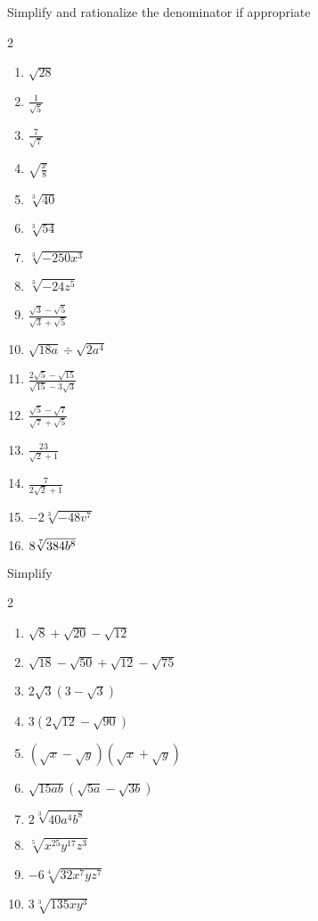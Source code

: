 \documentclass[12pt]{article}
\newenvironment{problem}[2][Problem]{\begin{trivlist}
\item[\hskip \labelsep {\bfseries #1}\hskip \labelsep {\bfseries #2.}]}{\end{trivlist}}
\begin{document}
\begin{problem}{3}
  Simplify and rationalize the denominator if appropriate
 \begin{multicols}{2}
   \begin{enumerate}[label=\roman*)]
     \item $ \sqrt{28}$
     \item $\frac{1}{\sqrt{5}}$
     \item $ \frac{7}{\sqrt{7}}$
     \item $\sqrt{\frac{x}{8}}$
     \item $ \sqrt[3]{40}$
     \item $ \sqrt[3]{54}$
     \item $\sqrt[3]{-250x^3}$
     \item $ \sqrt[3]{-24z^5}$
     \item $\frac{\sqrt{3}-\sqrt{5}}{\sqrt{3}+\sqrt{5}}$
     \item $\sqrt{18a}\div\sqrt{2a^4}$
     \item $\frac{2\sqrt{5}-\sqrt{15}}{\sqrt{15}-3\sqrt{3}}$
     \item $\frac{\sqrt{5}-\sqrt{7}}{\sqrt{7}+\sqrt{5}}$
     \item $ \frac{23}{\sqrt{2}+1}$
     \item $ \frac{7}{2\sqrt{2}+1} $
     \item $ -2\sqrt[3]{-48v^7}$
       \item $ \-8\sqrt[7]{384b^8} $
  \end{enumerate}
 \end{multicols}
\end{problem}


\begin{problem}{4} Simplify
 \begin{multicols}{2}
   \begin{enumerate}[label=\roman*)]
   \item $\sqrt{8}+\sqrt{20}-\sqrt{12}$
   \item $\sqrt{18}-\sqrt{50}+\sqrt{12}-\sqrt{75}$
   \item $ 2\sqrt{3}(3-\sqrt{3})$
   \item $ 3(2\sqrt{12}-\sqrt{90})$
   \item $(\sqrt{x}-\sqrt{y})(\sqrt{x}+\sqrt{y})$
   \item $ \sqrt{15ab}(\sqrt{5a}-\sqrt{3b})$
   \item $2\sqrt[3]{40a^4b^8}$
   \item $ \sqrt[5]{x^{25}y^{17}z^3}$
   \item $ -6\sqrt[4]{32x^7yz^7} $
   \item $ 3\sqrt[3]{135xy^3} $
  \end{enumerate}
 \end{multicols}
\end{problem}
\end{document}
